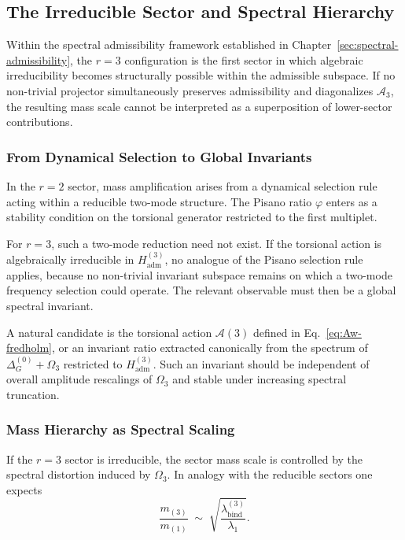\subsection{The Irreducible Sector and Spectral Hierarchy}
  \label{sec:baryonic-sector}

  Within the spectral admissibility framework established in Chapter~\ref{sec:spectral-admissibility},
  the $r=3$ configuration is the first sector in which algebraic
  irreducibility becomes structurally possible within the admissible
  subspace.
  If no non-trivial projector simultaneously preserves admissibility and
  diagonalizes $\mathcal{A}_3$, the resulting mass scale cannot be
  interpreted as a superposition of lower-sector contributions.

  \subsubsection*{From Dynamical Selection to Global Invariants}

    In the $r=2$ sector, mass amplification arises from a dynamical
    selection rule acting within a reducible two-mode structure.
    The Pisano ratio $\varphi$ enters as a stability condition on the
    torsional generator restricted to the first multiplet.

    For $r=3$, such a two-mode reduction need not exist.
    If the torsional action is algebraically irreducible in
    $H_{\mathrm{adm}}^{(3)}$, no analogue of the Pisano selection rule
    applies, because no non-trivial invariant subspace remains on which
    a two-mode frequency selection could operate.
    The relevant observable must then be a global spectral invariant.

    A natural candidate is the torsional action
    \(
    \mathcal{A}(3)
    \)
    defined in Eq.~\eqref{eq:Aw-fredholm},
    or an invariant ratio extracted canonically from the spectrum of
    \(
    \Delta^{(0)}_G+\Omega_3
    \)
    restricted to $H_{\mathrm{adm}}^{(3)}$.
    Such an invariant should be independent of overall amplitude
    rescalings of $\Omega_3$ and stable under increasing spectral
    truncation.

  \subsubsection*{Mass Hierarchy as Spectral Scaling}

    If the $r=3$ sector is irreducible,
    the sector mass scale is controlled by the spectral distortion
    induced by $\Omega_3$.
    In analogy with the reducible sectors one expects
    \begin{equation}
      \frac{m_{(3)}}{m_{(1)}}
      \;\sim\;
      \sqrt{
        \frac{\lambda_{\mathrm{bind}}^{(3)}}
        {\lambda_{1}}
      }.
    \end{equation}

